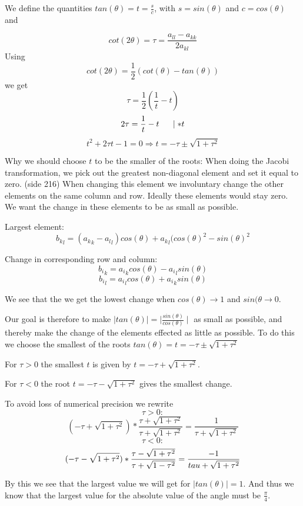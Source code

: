 \documentclass[a4paper,12pt, english]{article}
\begin{document}
We define the quantities $tan(\theta) = t = \frac{s}{c}$, with $s=sin(\theta)$ and $c = cos(\theta)$ and 

$$cot(2\theta) = \tau = \frac{a_{ll}- a_{kk}}{2a_{kl}} $$ 
Using $$cot(2\theta) = \frac{1}{2}(cot(\theta) - tan(\theta))$$ we get 
$$\tau = \frac{1}{2}(\frac{1}{t} -t) $$
$$2\tau = \frac{1}{t} - t \hspace{5mm} \mid *t $$
$$t^2 + 2\tau t - 1 = 0 \Rightarrow t = -\tau \pm \sqrt{1+\tau^2} $$


Why we should choose $t$ to be the smaller of the roots:
When doing the Jacobi transformation, we pick out the greatest non-diagonal element and set it equal to zero.
(side 216)
When changing this element we involuntary change the other elements on the same column and row. Ideally these elements would stay zero. We want the change in these elements to be as small as possible. 

Largest element:
$$ {b_k}_l = ({a_k}_k - {a_l}_l) cos(\theta) + {a_k}_l(cos(\theta)^2 - sin(\theta)^2$$

Change in corresponding row and column:
$$ {b_i}_k = {a_i}_kcos(\theta) - {a_i}_lsin(\theta) $$
$$ {b_i}_l = {a_i}_lcos(\theta) + {a_i}_ksin(\theta) $$
  
We see that the we get the lowest change when $cos(\theta) \rightarrow 1$ and $sin(\theta \rightarrow 0$.

Our goal is therefore to make $ \mid tan(\theta) \mid  = \mid \frac{sin(\theta)}{cos(\theta)} \mid$ as small as possible, and thereby make the change of the elements effected as little as possible.
To do this we choose the smallest of the roots $tan(\theta) = t = - \tau \pm \sqrt{1+\tau^2}$

For $\tau > 0$ the smallest $t$ is given by $ t = - \tau + \sqrt{1+ \tau^2}$.

For $\tau < 0$ the root $ t = - \tau - \sqrt{1+ \tau^2}$ gives the smallest change.  
  
To avoid loss of numerical precision we rewrite
$$\tau>0:$$
$$(-\tau + \sqrt{1 + \tau^2}) * \frac{\tau + \sqrt{1+\tau^2}}{\tau + \sqrt{1+\tau^2}} = \frac{1}{\tau + \sqrt{1+\tau^2}} $$
$$\tau<0:$$
$$(-\tau - \sqrt{1 + \tau^2}) * \frac{\tau - \sqrt{1+\tau^2}}{\tau + \sqrt{1-\tau^2}} = \frac{-1}{\-tau + \sqrt{1+\tau^2}}$$

By this we see that the largest value we will get for $\mid tan(\theta) \mid = 1$. And thus we know that the largest value for the absolute value of the angle must be $\frac{\pi}{4}$. \\ 
  
\end{document}
